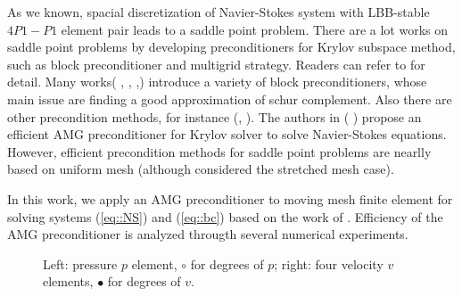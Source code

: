 \documentclass{eajam}
\begin{document}
    As we known, spacial discretization of Navier-Stokes system with
    LBB-stable $4P1-P1$ element pair leads to a saddle point problem.
    There are a lot works on saddle point problems by developing
    preconditioners for Krylov subspace method, such as block
    preconditioner and multigrid strategy. Readers can refer to
    \cite{benzi2005numerical} for detail. Many works(
    \cite{bai2005inexact}, \cite{bai2006structured},
    \cite{elman2007least},\cite{elman2009boundary}) introduce a
    variety of block preconditioners, whose main issue are finding a
    good approximation of schur complement. Also there are other
    precondition methods, for instance (\cite{benzi2006augmented},
    \cite{benzi2011relaxed}). The authors in (\cite{boyle2007hsl}
    \cite{boyle2010hsl_mi20}) propose an efficient AMG preconditioner
    for Krylov solver to solve Navier-Stokes equations. However,
    efficient precondition methods for saddle point problems are nearlly
    based on uniform mesh (although \cite{benzi2011relaxed} considered
    the stretched mesh case).
    
    In this work, we apply an AMG preconditioner to moving mesh
    finite element for solving systems (\ref{eq::NS}) and
    (\ref{eq::bc}) based on the work of
    \cite{elman2005finite}. Efficiency of the AMG preconditioner is 
    analyzed througth several numerical experiments.

    \begin{figure}
      \centering    
      \caption{Left: pressure $p$ element, $\circ$ for degrees of $p$; 
               right: four velocity $v$ elements, $\bullet$ for degrees
               of $v$.}
      \label{fig::p-v}       
    \end{figure}
      
\end{document}
